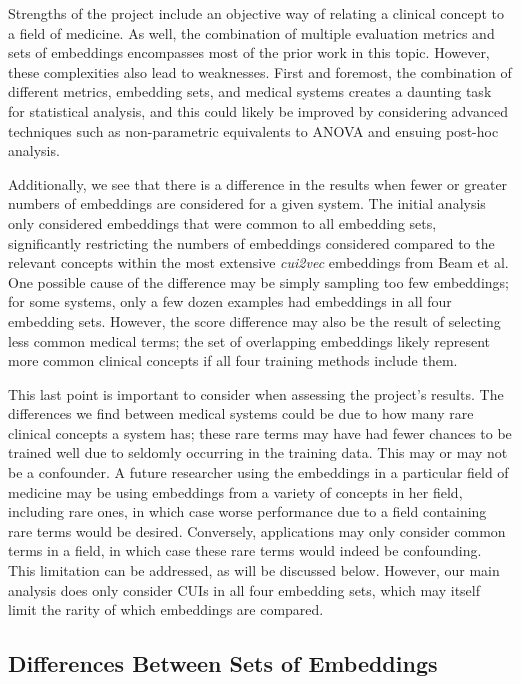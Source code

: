 \documentclass[11pt,a4paper]{article}
\begin{document}
Strengths of the project include an objective way of relating a clinical concept to a field of medicine. As well, the combination of multiple evaluation metrics and sets of embeddings encompasses most of the prior work in this topic.  However, these complexities also lead to weaknesses. First and foremost, the combination of different metrics, embedding sets, and medical systems creates a daunting task for statistical analysis, and this could likely be improved by considering advanced techniques such as non-parametric equivalents to ANOVA and ensuing post-hoc analysis. 

Additionally, we see that there is a difference in the results when fewer or greater numbers of embeddings are considered for a given system. The initial analysis only considered embeddings that were common to all embedding sets, significantly restricting the numbers of embeddings considered compared to the relevant concepts within the most extensive \emph{cui2vec} embeddings from Beam et al. One possible cause of the difference may be simply sampling too few embeddings; for some systems, only a few dozen examples had embeddings in all four embedding sets. However, the score difference may also be the result of selecting less common medical terms; the set of overlapping embeddings likely represent more common clinical concepts if all four training methods include them. 

This last point is important to consider when assessing the project's results. The differences we find between medical systems could be due to how many rare clinical concepts a system has; these rare terms may have had fewer chances to be trained well due to seldomly occurring in the training data. This may or may not be a confounder. A future researcher using the embeddings in a particular field of medicine may be using embeddings from a variety of concepts in her field, including rare ones, in which case worse performance due to a field containing rare terms would be desired. Conversely, applications may only consider common terms in a field, in which case these rare terms would indeed be confounding. This limitation can be addressed, as will be discussed below. However, our main analysis does only consider CUIs in all four embedding sets, which may itself limit the rarity of which embeddings are compared. 

\subsection{Differences Between Sets of Embeddings}
\end{document}
